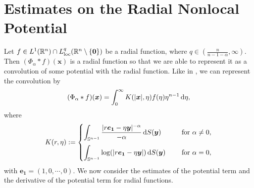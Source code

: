 \documentclass[reqno,11pt]{amsart}
\numberwithin{equation}{section}
\theoremstyle{definition}
\def\dd{{\, \rm d}}
\begin{document}
\section{Estimates on the Radial Nonlocal Potential}
Let $f \in L^1(\mathbb{R}^n) \cap L^q_{\rm loc}(\mathbb{R}^n \setminus \{\boldsymbol{0}\})$
be a radial function, where $q \in (\frac{n}{n - 1 - \alpha}, \infty)$.
Then $(\Phi_\alpha*f)(\boldsymbol{x})$ is a radial function so that we are able to represent
it as a convolution of some potential with the radial function.
Like in \cite{BALAGUE20135}, we can represent the convolution by
\begin{equation*}
    (\Phi_\alpha*f)(\boldsymbol{x}) = \int^{\infty}_{0} K(|\boldsymbol{x}|,\eta) f(\eta) \eta^{n-1}
    \dd \eta,
\end{equation*}
where
\begin{equation*}
    K(r,\eta) := \begin{cases}
  \displaystyle
 \int_{\mathbb{S}^{n-1}} \frac{|r\boldsymbol{e_1}-\eta \boldsymbol{y}|^{-\alpha}}{-\alpha} \dd S (\boldsymbol{y}) & \mbox{ for $\alpha \neq 0$}, \\[4mm]
\displaystyle
 \int_{\mathbb{S}^{n-1}} \log(|r\boldsymbol{e_1}-\eta \boldsymbol{y}|) \dd S (\boldsymbol{y}) \quad &\mbox{ for $\alpha = 0$}, \\
\end{cases}
\end{equation*}
with $\boldsymbol{e_1} = (1,0,\cdots,0)$.
We now consider the estimates of the potential term and the derivative of the potential term 
for radial functions.
\end{document}
